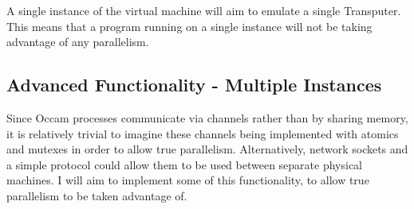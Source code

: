 A single instance of the virtual machine will aim to emulate a single
Transputer. This means that a program running on a single instance will not be
taking advantage of any parallelism.

\subsection{Advanced Functionality - Multiple Instances}

Since Occam processes communicate via channels rather than by sharing memory, it
is relatively trivial to imagine these channels being implemented with atomics
and mutexes in order to allow true parallelism. Alternatively, network sockets
and a simple protocol could allow them to be used between separate physical
machines. I will aim to implement some of this functionality, to allow true
parallelism to be taken advantage of.
